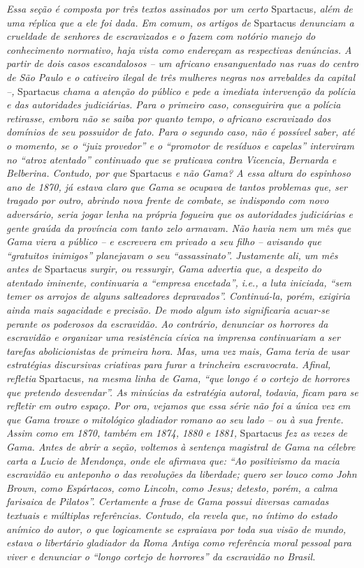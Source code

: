 {\emph{Essa seção é composta por três textos assinados por um certo}
Spartacus\emph{, além de uma réplica que a ele foi dada. Em comum, os
artigos de} Spartacus \emph{denunciam a crueldade de senhores de
escravizados e o fazem com notório manejo do conhecimento normativo,
haja vista como endereçam as respectivas denúncias. A partir de dois
casos escandalosos -- um africano ensanguentado nas ruas do centro de
São Paulo e o cativeiro ilegal de três mulheres negras nos arrebaldes da
capital --,} Spartacus \emph{chama a atenção do público e pede a
imediata intervenção da polícia e das autoridades judiciárias. Para o
primeiro caso, conseguirira que a polícia retirasse, embora não se saiba
por quanto tempo, o africano escravizado dos domínios de seu possuidor
de fato. Para o segundo caso, não é possível saber, até o momento, se o
``juiz provedor'' e o ``promotor de resíduos e capelas'' interviram no
``atroz atentado'' continuado que se praticava contra Vicencia, Bernarda e
Belberina. Contudo, por que} Spartacus \emph{e não Gama? A essa altura
do espinhoso ano de 1870, já estava claro que Gama se ocupava de tantos
problemas que, ser tragado por outro, abrindo nova frente de combate, se
indispondo com novo adversário, seria jogar lenha na própria fogueira
que os autoridades judiciárias e gente graúda da província com tanto
zelo armavam. Não havia nem um mês que Gama viera a público -- e
escrevera em privado a seu filho -- avisando que ``gratuitos inimigos''
planejavam o seu ``assassinato''. Justamente ali, um mês antes de}
Spartacus \emph{surgir, ou ressurgir, Gama advertia que, a despeito do
atentado iminente, continuaria a ``empresa encetada'', i.e., a luta
iniciada, ``sem temer os arrojos de alguns salteadores depravados''.
Continuá-la, porém, exigiria ainda mais sagacidade e precisão. De modo
algum isto significaria acuar-se perante os poderosos da escravidão. Ao
contrário, denunciar os horrores da escravidão e organizar uma
resistência cívica na imprensa continuariam a ser tarefas abolicionistas
de primeira hora. Mas, uma vez mais, Gama teria de usar estratégias
discursivas criativas para furar a trincheira escravocrata. Afinal,
refletia} Spartacus\emph{, na mesma linha de Gama, ``que longo é o
cortejo de horrores que pretendo desvendar''. As minúcias da estratégia
autoral, todavia, ficam para se refletir em outro espaço. Por ora,
vejamos que essa série não foi a única vez em que Gama trouxe o
mitológico gladiador romano ao seu lado -- ou à sua frente. Assim como
em 1870, também em 1874, 1880 e 1881,} Spartacus \emph{fez as vezes de
Gama. Antes de abrir a seção, voltemos à sentença magistral de Gama na
célebre carta a Lucio de Mendonça, onde ele afirmava que: ``Ao
positivismo da macia escravidão eu anteponho o das revoluções da
liberdade; quero ser louco como John Brown, como Espártacos, como
Lincoln, como Jesus; detesto, porém, a calma farisaica de Pilatos''.
Certamente a frase de Gama possui diversas camadas textuais e múltiplas
referências. Contudo, ela revela que, no íntimo do estado anímico do
autor, o que logicamente se espraiava por toda sua visão de mundo,
estava o libertário gladiador da Roma Antiga como referência moral
pessoal para viver e denunciar o ``longo cortejo de horrores'' da
escravidão no Brasil.}

}

